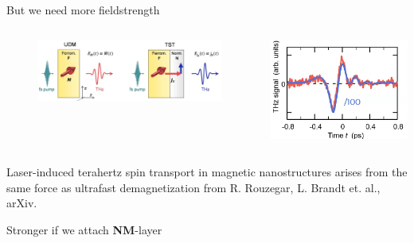 \documentclass[aspectratio=1610, 9pt]{beamer}
\begin{document}
\begin{frame}{But we need more fieldstrength}
  \begin{columns}
    \begin{column}{0.6\textwidth}
      \begin{figure}
      \includegraphics[width=\textwidth]{pics/FMNM.png}
      \nocite{arxiv}
      \end{figure}
    \end{column}
    \begin{column}{0.4\textwidth}
      \includegraphics[width=\textwidth]{pics/FM-vsdouble.png}
    \end{column}
  \end{columns}
  \vspace{0.3in}
  \small\textcolor{tugreen}{Laser-induced terahertz spin transport in magnetic nanostructures arises from the same force as ultrafast demagnetization} from R. Rouzegar, L. Brandt et. al., arXiv.
  \vspace{0.3in}
  \begin{center}
    \Large Stronger if we attach \textbf{NM}-layer
  \end{center}
\end{frame}
\end{document}
